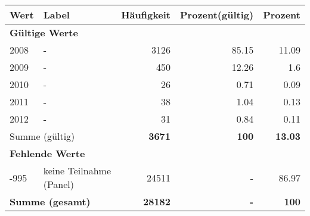      \begin{longtable}{lXrrr}
     \toprule
     \textbf{Wert} & \textbf{Label} & \textbf{Häufigkeit} & \textbf{Prozent(gültig)} & \textbf{Prozent} \\
     \endhead
     \midrule
     \multicolumn{5}{l}{\textbf{Gültige Werte}}\\

     2008 &
     \multicolumn{1}{X}{ -  } &


       \num{3126} &
       \num[round-mode=places,round-precision=2]{85.15} &
         \num[round-mode=places,round-precision=2]{11.09} \\

     2009 &
     \multicolumn{1}{X}{ -  } &


       \num{450} &
       \num[round-mode=places,round-precision=2]{12.26} &
         \num[round-mode=places,round-precision=2]{1.6} \\

     2010 &
     \multicolumn{1}{X}{ -  } &


       \num{26} &
       \num[round-mode=places,round-precision=2]{0.71} &
         \num[round-mode=places,round-precision=2]{0.09} \\

     2011 &
     \multicolumn{1}{X}{ -  } &


       \num{38} &
       \num[round-mode=places,round-precision=2]{1.04} &
         \num[round-mode=places,round-precision=2]{0.13} \\

     2012 &
     \multicolumn{1}{X}{ -  } &


       \num{31} &
       \num[round-mode=places,round-precision=2]{0.84} &
         \num[round-mode=places,round-precision=2]{0.11} \\
     \midrule
     \multicolumn{2}{l}{Summe (gültig)} &
       \textbf{\num{3671}} &
     \textbf{\num{100}} &
       \textbf{\num[round-mode=places,round-precision=2]{13.03}} \\
     \multicolumn{5}{l}{\textbf{Fehlende Werte}}\\
       -995 &
       keine Teilnahme (Panel) &
         \num{24511} &
        - &
         \num[round-mode=places,round-precision=2]{86.97} \\
     \midrule
     \multicolumn{2}{l}{\textbf{Summe (gesamt)}} &
          \textbf{\num{28182}} &
        \textbf{-} &
        \textbf{\num{100}} \\
     \bottomrule
     \end{longtable}
     
